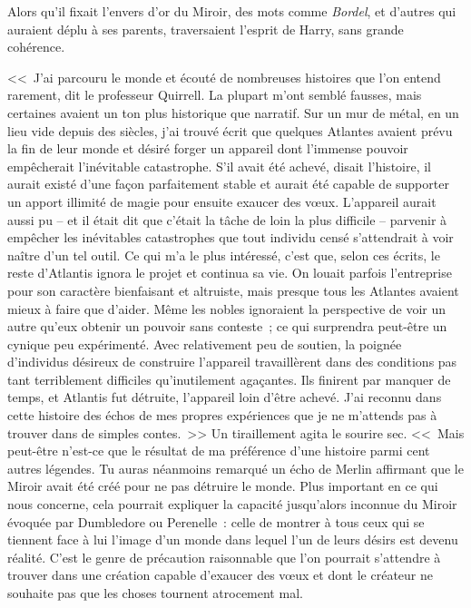 Alors qu'il fixait l'envers d'or du Miroir, des mots comme \emph{Bordel}, et d'autres qui auraient déplu à ses parents, traversaient l'esprit de Harry, sans grande cohérence.

<<~J'ai parcouru le monde et écouté de nombreuses histoires que l'on entend rarement, dit le professeur Quirrell. La plupart m'ont semblé fausses, mais certaines avaient un ton plus historique que narratif. Sur un mur de métal, en un lieu vide depuis des siècles, j'ai trouvé écrit que quelques Atlantes avaient prévu la fin de leur monde et désiré forger un appareil dont l'immense pouvoir empêcherait l'inévitable catastrophe. S'il avait été achevé, disait l'histoire, il aurait existé d'une façon parfaitement stable et aurait été capable de supporter un apport illimité de magie pour ensuite exaucer des vœux. L'appareil aurait aussi pu -- et il était dit que c'était la tâche de loin la plus difficile -- parvenir à empêcher les inévitables catastrophes que tout individu censé s'attendrait à voir naître d'un tel outil. Ce qui m'a le plus intéressé, c'est que, selon ces écrits, le reste d'Atlantis ignora le projet et continua sa vie. On louait parfois l'entreprise pour son caractère bienfaisant et altruiste, mais presque tous les Atlantes avaient mieux à faire que d'aider. Même les nobles ignoraient la perspective de voir un autre qu'eux obtenir un pouvoir sans conteste~; ce qui surprendra peut-être un cynique peu expérimenté. Avec relativement peu de soutien, la poignée d'individus désireux de construire l'appareil travaillèrent dans des conditions pas tant terriblement difficiles qu'inutilement agaçantes. Ils finirent par manquer de temps, et Atlantis fut détruite, l'appareil loin d'être achevé. J'ai reconnu dans cette histoire des échos de mes propres expériences que je ne m'attends pas à trouver dans de simples contes.~>> Un tiraillement agita le sourire sec. <<~Mais peut-être n'est-ce que le résultat de ma préférence d'une histoire parmi cent autres légendes. Tu auras néanmoins remarqué un écho de Merlin affirmant que le Miroir avait été créé pour ne pas détruire le monde. Plus important en ce qui nous concerne, cela pourrait expliquer la capacité jusqu'alors inconnue du Miroir évoquée par Dumbledore ou Perenelle~: celle de montrer à tous ceux qui se tiennent face à lui l'image d'un monde dans lequel l'un de leurs désirs est devenu réalité. C'est le genre de précaution raisonnable que l'on pourrait s'attendre à trouver dans une création capable d'exaucer des vœux et dont le créateur ne souhaite pas que les choses tournent atrocement mal.

